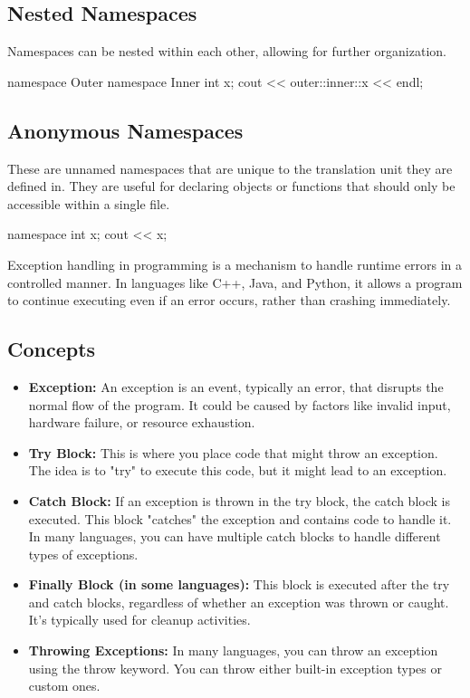 \documentclass{report}
\begin{document}
    \bigbreak \noindent 
    \subsection{Nested Namespaces} 
    \bigbreak \noindent 
    Namespaces can be nested within each other, allowing for further organization. 
    \bigbreak \noindent 
    \begin{cppcode}
    namespace Outer {
        namespace Inner {
            int x;
        }
    }
    cout << outer::inner::x  << endl;
    \end{cppcode}

    \bigbreak \noindent 
    \subsection{Anonymous Namespaces}
    \bigbreak \noindent 
    These are unnamed namespaces that are unique to the translation unit they are defined in. They are useful for declaring objects or functions that should only be accessible within a single file. 
    \bigbreak \noindent 
    \begin{cppcode}
    namespace {
        int x;
    }
    cout << x; 
    \end{cppcode}

    \pagebreak 
    \bigbreak \noindent 
    \begin{concept}
        Exception handling in programming is a mechanism to handle runtime errors in a controlled manner. In languages like C++, Java, and Python, it allows a program to continue executing even if an error occurs, rather than crashing immediately. 
    \end{concept}
    \bigbreak \noindent 
    \subsection{Concepts}
    \begin{itemize}
        \item \textbf{Exception:} An exception is an event, typically an error, that disrupts the normal flow of the program. It could be caused by factors like invalid input, hardware failure, or resource exhaustion.
        \item \textbf{Try Block:} This is where you place code that might throw an exception. The idea is to "try" to execute this code, but it might lead to an exception.
        \item \textbf{Catch Block:} If an exception is thrown in the try block, the catch block is executed. This block "catches" the exception and contains code to handle it. In many languages, you can have multiple catch blocks to handle different types of exceptions.
        \item \textbf{Finally Block (in some languages):} This block is executed after the try and catch blocks, regardless of whether an exception was thrown or caught. It's typically used for cleanup activities.
        \item \textbf{Throwing Exceptions:} In many languages, you can throw an exception using the throw keyword. You can throw either built-in exception types or custom ones.
    \end{itemize}
\end{document}
